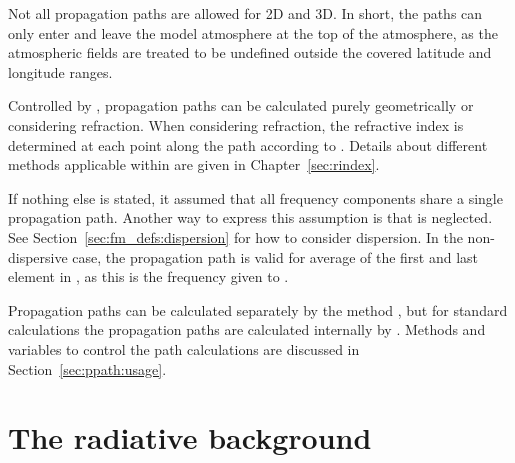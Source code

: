 Not all propagation paths are allowed for 2D and 3D. In short, the paths can
only enter and leave the model atmosphere at the top of the atmosphere, as the
atmospheric fields are treated to be undefined outside the covered latitude and
longitude ranges.

Controlled by , propagation paths can be 
calculated purely geometrically or considering refraction. When considering 
refraction, the refractive index is determined at each point along the path 
according to . Details about different methods 
applicable within  are given in 
Chapter~\ref{sec:rindex}.

If nothing else is stated, it assumed that all frequency components share a
single propagation path. Another way to express this assumption is that
 is neglected. See Section~\ref{sec:fm_defs:dispersion}
for how to consider dispersion. In the non-dispersive case, the propagation
path is valid for average of the first and last element in ,
as this is the frequency given to .

Propagation paths can be calculated separately by the method
, but for standard calculations the propagation paths are
calculated internally by . Methods and variables to control
the path calculations are discussed in Section~\ref{sec:ppath:usage}. 



\section{The radiative background}
\label{sec:fm_defs:rad_bkgr}

